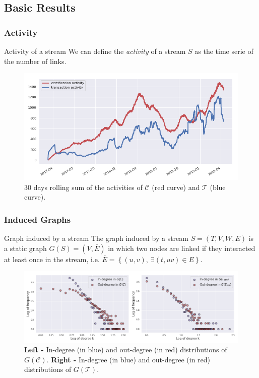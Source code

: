 \documentclass{beamer}
\begin{document}
\subsection{Basic Results}

\begin{frame}
	\frametitle{Activity}
	\begin{block}{Activity of a stream}
We can define the \textit{activity} of a stream $S$ as the time serie of the number of links.
	\end{block}
	\bigskip
	\begin{figure}
		\includegraphics[width=.8\linewidth]{./figures/activity}
		\caption{30 days rolling sum of the activities of $ \mathcal{C}$ (red curve) and $\mathcal{T}$ (blue curve).}
	\end{figure}
\end{frame}


\begin{frame}
	\frametitle{Induced Graphs}
	\begin{block}{Graph induced by a stream}
	The graph induced by a stream $S = \left(T, V, W, E \right)$ is a static graph $ G \left(S \right) = \left(V, \bar{E} \right)$ in which two nodes are linked if they interacted at least once in the stream, i.e. $ \bar{E} = \left\{ \left( u, v \right),\ \exists \left(t, uv \right) \in E \right\}$.
	\end{block}
	\bigskip
	\begin{figure}
		\includegraphics[width=.9\linewidth]{./figures/degree_distribution}
		\caption{\textbf{Left -} In-degree (in blue) and out-degree (in red) distributions of $G \left( \mathcal{C} \right)$. \textbf{Right -} In-degree (in blue) and out-degree (in red) distributions of $G \left( \mathcal{T} \right)$.}
	\end{figure}
\end{frame}
\end{document}
